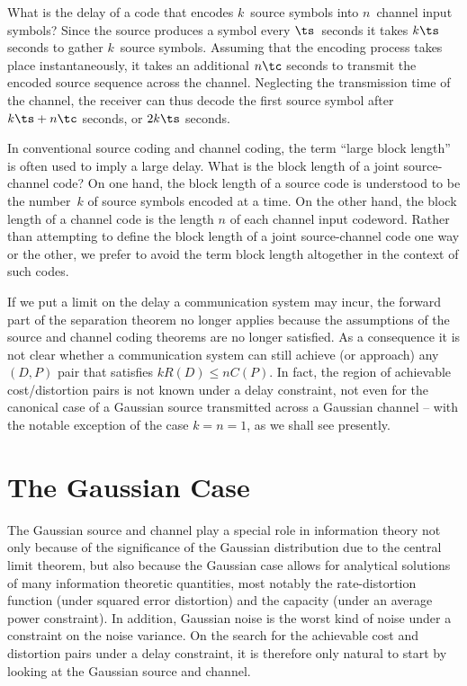 What is the delay of a code that encodes $k$~source symbols into $n$~channel
input symbols? Since the source produces a symbol every $\ts$~seconds it takes
$k\ts$ seconds to gather $k$~source symbols. Assuming that the encoding process
takes place instantaneously, it takes an additional $n\tc$ seconds to transmit
the encoded source sequence across the channel. Neglecting the transmission time
of the channel, the receiver can thus decode the first source symbol after $k\ts
+ n \tc$ seconds, or $2k\ts$ seconds.

\begin{remark}
  \label{rem:blocklength}
  In conventional source coding and channel coding, the term ``large block
  length'' is often used to imply a large delay. What is the block length of a
  joint source-channel code? On one hand, the block length of a source code is
  understood to be the number~$k$ of source symbols encoded at a time. On the
  other hand, the block length of a channel code is the length $n$ of each
  channel input codeword. Rather than attempting to define the block length of a
  joint source-channel code one way or the other, we prefer to avoid the term
  block length altogether in the context of such codes. 
\end{remark}

If we put a limit on the delay a communication system may incur, the forward
part of the separation theorem no longer applies because the assumptions of the
source and channel coding theorems are no longer satisfied. As a consequence it
is not clear whether a communication system can still achieve (or approach) any
$(D,P)$ pair that satisfies $k R(D) \le n C(P)$. 
In fact, the region of achievable cost/distortion pairs is not known under a
delay constraint, not even for the canonical case of a Gaussian source
transmitted across a Gaussian channel -- with the notable exception of the case
$k=n=1$, as we shall see presently.


\section{The Gaussian Case}

The Gaussian source and channel play a special role in information theory not
only because of the significance of the Gaussian distribution due to the central
limit theorem, but also because the Gaussian case allows for analytical
solutions of many information theoretic quantities, most notably the
rate-distortion function (under squared error distortion) and the capacity
(under an average power constraint). In addition, Gaussian noise is the worst
kind of noise under a constraint on the noise variance. On the search for the
achievable cost and distortion pairs under a delay constraint, it is therefore
only natural to start by looking at the Gaussian source and channel. 

